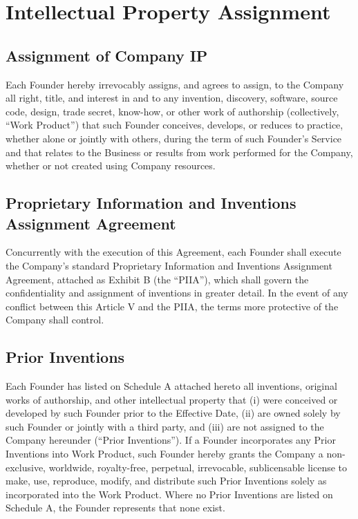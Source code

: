 \section{Intellectual Property Assignment}

\subsection{Assignment of Company IP} Each Founder hereby irrevocably assigns, and agrees to assign, to the Company all right, title, and interest in and to any invention, discovery, software, source code, design, trade secret, know-how, or other work of authorship (collectively, ``Work Product'') that such Founder conceives, develops, or reduces to practice, whether alone or jointly with others, during the term of such Founder's Service and that relates to the Business or results from work performed for the Company, whether or not created using Company resources.

\subsection{Proprietary Information and Inventions Assignment Agreement} Concurrently with the execution of this Agreement, each Founder shall execute the Company's standard Proprietary Information and Inventions Assignment Agreement, attached as Exhibit B (the ``PIIA''), which shall govern the confidentiality and assignment of inventions in greater detail. In the event of any conflict between this Article V and the PIIA, the terms more protective of the Company shall control.

\subsection{Prior Inventions} Each Founder has listed on Schedule A attached hereto all inventions, original works of authorship, and other intellectual property that (i) were conceived or developed by such Founder prior to the Effective Date, (ii) are owned solely by such Founder or jointly with a third party, and (iii) are not assigned to the Company hereunder (``Prior Inventions''). If a Founder incorporates any Prior Inventions into Work Product, such Founder hereby grants the Company a non-exclusive, worldwide, royalty-free, perpetual, irrevocable, sublicensable license to make, use, reproduce, modify, and distribute such Prior Inventions solely as incorporated into the Work Product. Where no Prior Inventions are listed on Schedule A, the Founder represents that none exist.

